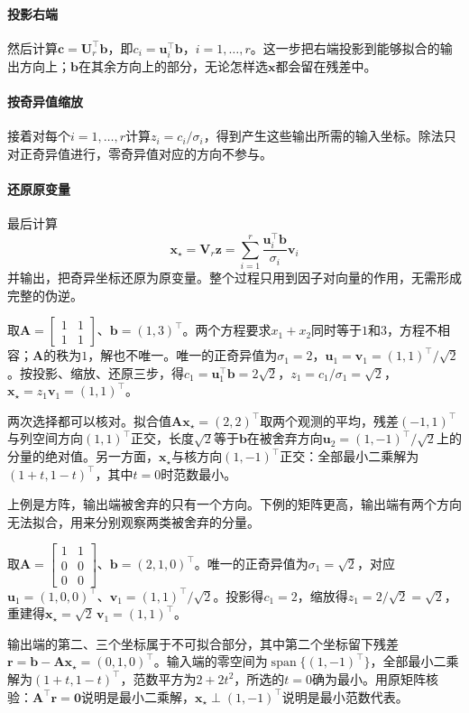 \paragraph{投影右端}
然后计算$\bm c=\bm U_r^\top\bm b$，即$c_i=\bm u_i^\top\bm b$，$i=1,\ldots,r$。这一步把右端投影到能够拟合的输出方向上；$\bm b$在其余方向上的部分，无论怎样选$\bm x$都会留在残差中。

\paragraph{按奇异值缩放}
接着对每个$i=1,\ldots,r$计算$z_i=c_i/\sigma_i$，得到产生这些输出所需的输入坐标。除法只对正奇异值进行，零奇异值对应的方向不参与。

\paragraph{还原原变量}
最后计算
\[
 \bm x_\star=\bm V_r\bm z=\sum_{i=1}^r\frac{\bm u_i^\top\bm b}{\sigma_i}\bm v_i
\]
并输出，把奇异坐标还原为原变量。整个过程只用到因子对向量的作用，无需形成完整的伪逆。

\begin{example}[秩一矩阵的SVD求解]
\label{ex:ls-svd-solve-rank-one}
取$\bm A=\left[\begin{smallmatrix}1&1\\1&1\end{smallmatrix}\right]$、$\bm b=(1,3)^\top$。两个方程要求$x_1+x_2$同时等于$1$和$3$，方程不相容；$\bm A$的秩为$1$，解也不唯一。唯一的正奇异值为$\sigma_1=2$，$\bm u_1=\bm v_1=(1,1)^\top/\sqrt2$。按投影、缩放、还原三步，得$c_1=\bm u_1^\top\bm b=2\sqrt2$，$z_1=c_1/\sigma_1=\sqrt2$，$\bm x_\star=z_1\bm v_1=(1,1)^\top$。

两次选择都可以核对。拟合值$\bm A\bm x_\star=(2,2)^\top$取两个观测的平均，残差$(-1,1)^\top$与列空间方向$(1,1)^\top$正交，长度$\sqrt2$等于$\bm b$在被舍弃方向$\bm u_2=(1,-1)^\top/\sqrt2$上的分量的绝对值。另一方面，$\bm x_\star$与核方向$(1,-1)^\top$正交：全部最小二乘解为$(1+t,1-t)^\top$，其中$t=0$时范数最小。
\end{example}

上例是方阵，输出端被舍弃的只有一个方向。下例的矩阵更高，输出端有两个方向无法拟合，用来分别观察两类被舍弃的分量。

\begin{example}[秩亏且不相容的高矩阵]
\label{ex:ls-svd-solve-tall}
取$\bm A=\left[\begin{smallmatrix}1&1\\0&0\\0&0\end{smallmatrix}\right]$、$\bm b=(2,1,0)^\top$。唯一的正奇异值为$\sigma_1=\sqrt2$，对应$\bm u_1=(1,0,0)^\top$、$\bm v_1=(1,1)^\top/\sqrt2$。投影得$c_1=2$，缩放得$z_1=2/\sqrt2=\sqrt2$，重建得$\bm x_\star=\sqrt2\,\bm v_1=(1,1)^\top$。

输出端的第二、三个坐标属于不可拟合部分，其中第二个坐标留下残差$\bm r=\bm b-\bm A\bm x_\star=(0,1,0)^\top$。输入端的零空间为$\operatorname{span}\{(1,-1)^\top\}$，全部最小二乘解为$(1+t,1-t)^\top$，范数平方为$2+2t^2$，所选的$t=0$确为最小。用原矩阵核验：$\bm A^\top\bm r=\bm0$说明是最小二乘解，$\bm x_\star\perp(1,-1)^\top$说明是最小范数代表。
\end{example}

